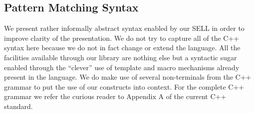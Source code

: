 \documentclass[preprint]{sigplanconf}
\begin{document}
\subsection{Pattern Matching Syntax}
\label{sec:syn}

We present rather informally abstract syntax enabled by our SELL in order to 
improve clarity of the presentation. We do not try to capture all of the C++ 
syntax here because we do not in fact change or extend the language. All the 
facilities available through our library are nothing else but a syntactic sugar 
enabled through the ``clever'' use of template and macro mechanisms already 
present in the language. We do make use of several non-terminals from the C++ 
grammar to put the use of our constructs into context. For the complete C++ 
grammar we refer the curious reader to Appendix A of the current C++ 
standard\cite{C++0x}.

\end{document}
